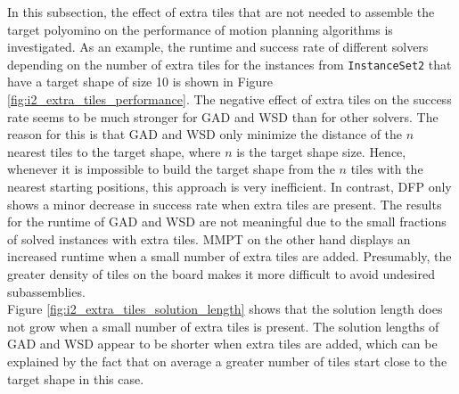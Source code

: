 In this subsection, the effect of extra tiles that are not needed to assemble the target polyomino on the performance of motion planning algorithms is investigated.
As an example, the runtime and success rate of different solvers depending on the number of extra tiles for the instances from \texttt{InstanceSet2} that have a target shape of size 10 is shown in Figure \ref{fig:i2_extra_tiles_performance}. The negative effect of extra tiles on the success rate seems to be much stronger for GAD and WSD than for other solvers. The reason for this is that GAD and WSD only minimize the distance of the $n$ nearest tiles to the target shape, where $n$ is the target shape size. Hence, whenever it is impossible to build the target shape from the $n$ tiles with the nearest starting positions, this approach is very inefficient. In contrast, DFP only shows a minor decrease in success rate when extra tiles are present.
The results for the runtime of GAD and WSD are not meaningful due to the small fractions of solved instances with extra tiles. MMPT on the other hand displays an increased runtime when a small number of extra tiles are added. Presumably, the greater density of tiles on the board makes it more difficult to avoid undesired subassemblies.\\
Figure \ref{fig:i2_extra_tiles_solution_length} shows that the solution length does not grow when a small number of extra tiles is present. The solution lengths of GAD and WSD appear to be shorter when extra tiles are added, which can be explained by the fact that on average a greater number of tiles start close to the target shape in this case.


